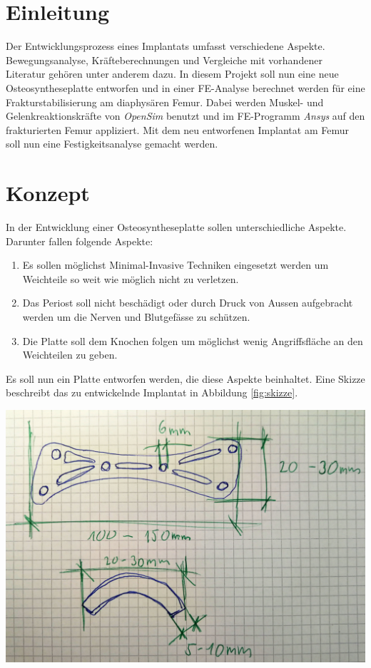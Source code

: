 
\section{Einleitung}
	Der Entwicklungsprozess eines Implantats umfasst verschiedene Aspekte.
	Bewegungsanalyse, Kräfteberechnungen und Vergleiche mit vorhandener Literatur gehören unter anderem dazu.
	In diesem Projekt soll nun eine neue Osteosyntheseplatte entworfen und in einer
	FE-Analyse berechnet werden für eine Frakturstabilisierung am diaphysären Femur.
	Dabei werden Muskel- und Gelenkreaktionskräfte von \textit{OpenSim} benutzt und
	im FE-Programm \textit{Ansys} auf den frakturierten Femur appliziert. Mit dem neu
	entworfenen Implantat am Femur soll nun eine Festigkeitsanalyse gemacht werden.

\section{Konzept}
	In der Entwicklung einer Osteosyntheseplatte sollen unterschiedliche Aspekte.
	Darunter fallen folgende Aspekte:
	
	\begin{enumerate}
		\setlength{\itemsep}{0mm}
		\setlength{\parskip}{0mm}
		\item Es sollen möglichst Minimal-Invasive Techniken eingesetzt werden um Weichteile
		      so weit wie möglich nicht zu verletzen.
		\item Das Periost soll nicht beschädigt oder durch Druck von Aussen aufgebracht werden
		      um die Nerven und Blutgefässe zu schützen.
		\item Die Platte soll dem Knochen folgen um möglichst wenig Angriffsfläche an den Weichteilen zu geben.
	\end{enumerate}

	Es soll nun ein Platte entworfen werden, die diese Aspekte beinhaltet. Eine Skizze beschreibt das
	zu entwickelnde Implantat in Abbildung \ref{fig:skizze}.
	
	\begin{Figure}
		\centering
		\includegraphics[width=15cm]{content/images/skizze.jpg}
		\label{fig:skizze}
	\end{Figure}

